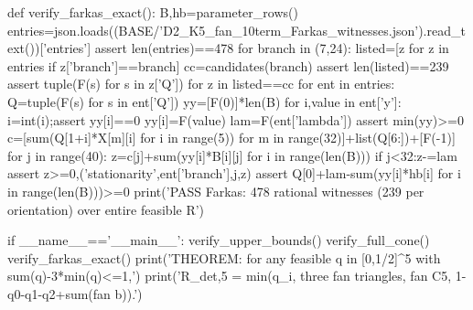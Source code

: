 \documentclass[UTF8,11pt,a4paper]{ctexart}
\begin{document}
\begin{CodeListing}
def verify_farkas_exact():
    B,hb=parameter_rows()
    entries=json.loads((BASE/'D2_K5_fan_10term_Farkas_witnesses.json').read_text())['entries']
    assert len(entries)==478
    for branch in (7,24):
        listed=[z for z in entries if z['branch']==branch]
        cc=candidates(branch)
        assert len(listed)==239
        assert {tuple(F(s) for s in z['Q']) for z in listed}==cc
    for ent in entries:
        Q=tuple(F(s) for s in ent['Q'])
        yy=[F(0)]*len(B)
        for i,value in ent['y']:
            i=int(i);assert yy[i]==0
            yy[i]=F(value)
        lam=F(ent['lambda'])
        assert min(yy)>=0
        c=[sum(Q[1+i]*X[m][i] for i in range(5)) for m in range(32)]+list(Q[6:])+[F(-1)]
        for j in range(40):
            z=c[j]+sum(yy[i]*B[i][j] for i in range(len(B)))
            if j<32:z-=lam
            assert z>=0,('stationarity',ent['branch'],j,z)
        assert Q[0]+lam-sum(yy[i]*hb[i] for i in range(len(B)))>=0
    print('PASS Farkas: 478 rational witnesses (239 per orientation) over entire feasible R')

if __name__=='__main__':
    verify_upper_bounds()
    verify_full_cone()
    verify_farkas_exact()
    print('THEOREM: for any feasible q in [0,1/2]^5 with sum(q)-3*min(q)<=1,')
    print('R_det,5 = min(q_i, three fan triangles, fan C5, 1-q0-q1-q2+sum(fan b)).')
\end{CodeListing}
\end{document}
